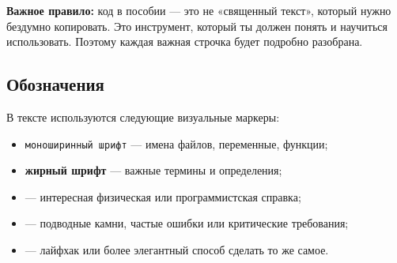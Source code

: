\textbf{Важное правило:} код в пособии — это не «священный текст», который
нужно бездумно копировать. Это инструмент, который ты должен понять и
научиться использовать. Поэтому каждая важная строчка будет подробно разобрана.

\subsection*{Обозначения}

В тексте используются следующие визуальные маркеры:
\begin{itemize}
	\item \texttt{моноширинный шрифт} — имена файлов, переменные, функции;
	\item \textbf{жирный шрифт} — важные термины и определения;
	\item {} — интересная физическая или программистская справка;
	\item {} — подводные камни, частые ошибки или критические требования;
	\item {} — лайфхак или более элегантный способ сделать то же самое.
\end{itemize}

